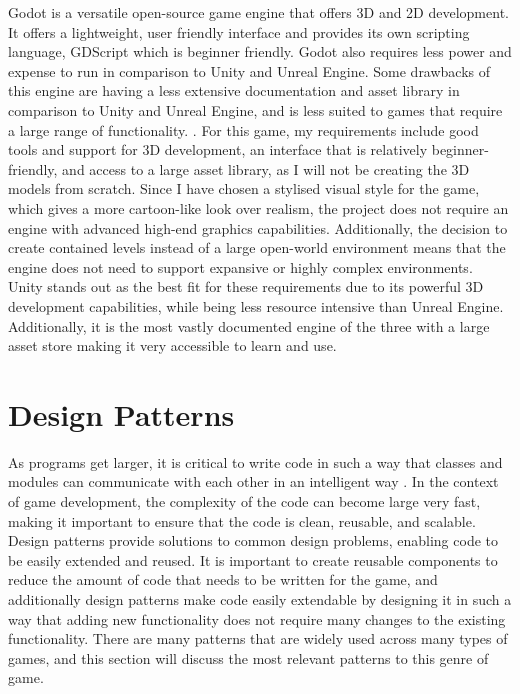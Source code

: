 \documentclass[]{final_report}
\begin{document}
\newline
Godot is a versatile open-source game engine that offers 3D and 2D development. It offers a lightweight, user friendly interface and provides its own scripting language, GDScript which is beginner friendly. Godot also requires less power and expense to run in comparison to Unity and Unreal Engine. Some drawbacks of this engine are having a less extensive documentation and asset library in comparison to Unity and Unreal Engine, and is less suited to games that require a large range of functionality. \cite{hatton_2024}. \newline
For this game, my requirements include good tools and support for 3D development, an interface that is relatively beginner-friendly, and access to a large asset library, as I will not be creating the 3D models from scratch. Since I have chosen a stylised visual style for the game, which gives a more cartoon-like look over realism, the project does not require an engine with advanced high-end graphics capabilities. Additionally, the decision to create contained levels instead of a large open-world environment means that the engine does not need to support expansive or highly complex environments.
Unity stands out as the best fit for these requirements due to its powerful 3D development capabilities, while being less resource intensive than Unreal Engine. Additionally, it is the most vastly documented engine of the three with a large asset store making it very accessible to learn and use.


\section{Design Patterns}
As programs get larger, it is critical to write code in such a way that classes and modules can communicate with each other in an intelligent way \cite{Doran2017}. In the context of game development, the complexity of the code can become large very fast, making it important to ensure that the code is clean, reusable, and scalable. Design patterns provide solutions to common design problems, enabling code to be easily extended and reused. It is important to create reusable components to reduce the amount of code that needs to be written for the game, and additionally design patterns make code easily extendable by designing it in such a way that adding new functionality does not require many changes to the existing functionality. There are many patterns that are widely used across many types of games\color{red}, and this section will discuss the most relevant patterns to this genre of game. \color{black}
\end{document}
